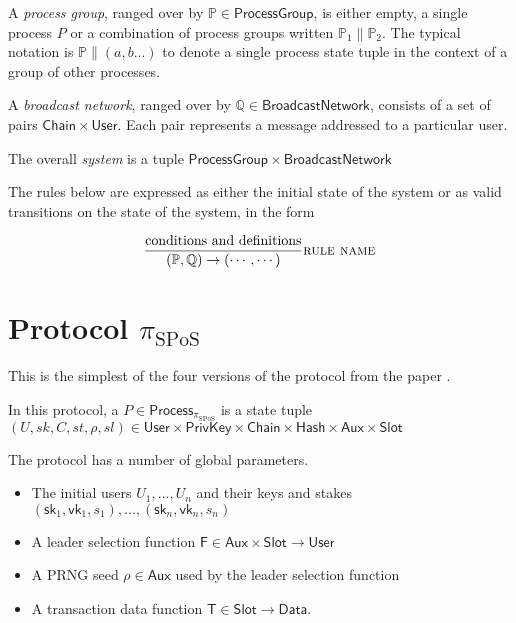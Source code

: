 \documentclass{article}
\newcommand{\sPar}{\mathrel{\parallel}}
\newcommand{\sSystem}[2]{\left( #1, #2 \right)}
\newcommand{\sProcess}[4]{\left( U, sk, #1, #2, #3, #4 \right)}
\newcommand{\sChain}{C}
\newcommand{\sState}{st}
\newcommand{\sSlot}{sl}
\newcommand{\sLeader}{\mathsf{F}}
\newcommand{\sQueue}{\mathbb{Q}}
\newcommand{\sProcesses}{\mathbb{P}}
\begin{document}
A \emph{process group}, ranged over by $\mathbb{P} \in \mathsf{ProcessGroup}$,
is either empty, a single process $P$ or a combination of process
groups written $\mathbb{P}_1 \sPar \mathbb{P}_2$. The typical notation is
$\sProcesses \sPar ( a, b ... )$ to denote a single process state
tuple in the context of a group of other processes.

A \emph{broadcast network}, ranged over by $\sQueue \in \mathsf{BroadcastNetwork}$, consists of a set of pairs $\mathsf{Chain} \times \mathsf{User}$.
Each pair represents a message addressed to a particular user.

The overall \emph{system} is a tuple $\mathsf{ProcessGroup} \times \mathsf{BroadcastNetwork}$

The rules below are expressed as either the initial state of the system or
as valid transitions on the state of the system, in the form

\begin{equation*}
\frac{
  \text{conditions and definitions}
}{
  \sSystem{ \sProcesses }{ \sQueue }
\rightarrow
  \sSystem{ \cdots }{ \cdots }
} \textsc{rule name}
\end{equation*}

\section{Protocol $\pi_{\text{SPoS}}$}

This is the simplest of the four versions of the protocol from the paper
\cite{ouroboros}.

In this protocol, a $P \in \mathsf{Process}_{\pi_{\text{SPoS}}}$ is
a state tuple $\sProcess{\sChain}{\sState}{\rho}{\sSlot} \in 
\mathsf{User} \times \mathsf{PrivKey} \times \mathsf{Chain} \times \mathsf{Hash} \times \mathsf{Aux} \times \mathsf{Slot}$

The protocol has a number of global parameters.
\begin{itemize}
\item The initial users $U_1, \ldots, U_n$ and their keys and stakes $(\mathsf{sk}_1, \mathsf{vk}_1, s_1), \ldots, (\mathsf{sk}_n, \mathsf{vk}_n, s_n)$
\item A leader selection function $\sLeader \in \mathsf{Aux} \times \mathsf{Slot} \rightarrow \mathsf{User}$
\item A PRNG seed $\rho \in \mathsf{Aux}$ used by the leader selection function
\item A transaction data function $\mathsf{T} \in \mathsf{Slot} \rightarrow \mathsf{Data}$.
\end{itemize}
\end{document}
